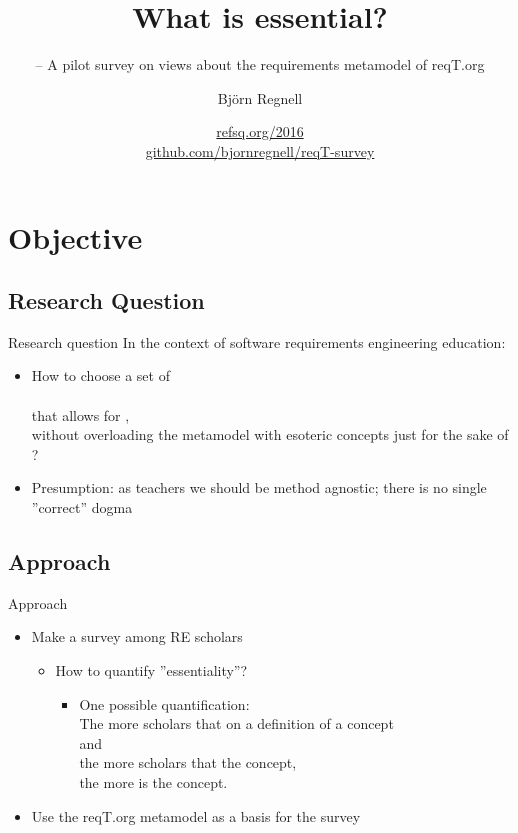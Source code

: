 \documentclass{slides}
\title[What is essential? -- A research preview]{What is essential?}
\subtitle{\footnotesize -- A pilot survey on views about the requirements metamodel of reqT.org}
\author{Björn Regnell}
\institute{Lund University, Sweden}
\date{\href{http://refsq.org/2016}{refsq.org/2016}\\ \href{https://github.com/bjornregnell/reqT-survey}{github.com/bjornregnell/reqT-survey}}
\begin{document}
\frame{\titlepage}
\frame{\tableofcontents}

\section{Objective}
\subsection{Research Question}
\begin{Slide}{Research question}
In the context of software requirements engineering education:
\begin{itemize}
\item How to choose a set of \\  \\ that allows for , \\ without overloading the metamodel with esoteric concepts just for the sake of ?
\pause
\item Presumption: as teachers we should be method agnostic; there is no single ''correct'' dogma
\end{itemize}
\end{Slide}
\subsection{Approach}
\begin{Slide}{Approach}
\begin{itemize}

\item Make a survey among RE scholars
\pause
\begin{itemize}
\item How to quantify ''essentiality''?
\pause
\begin{itemize}
\item One possible quantification: \\ The more scholars that  on a definition of a concept \\ and \\ the more scholars that  the concept, \\ the more  is the concept.
\end{itemize}
\end{itemize}
\pause
\item Use the reqT.org metamodel as a basis for the survey
\end{itemize}
\end{Slide}
\end{document}
